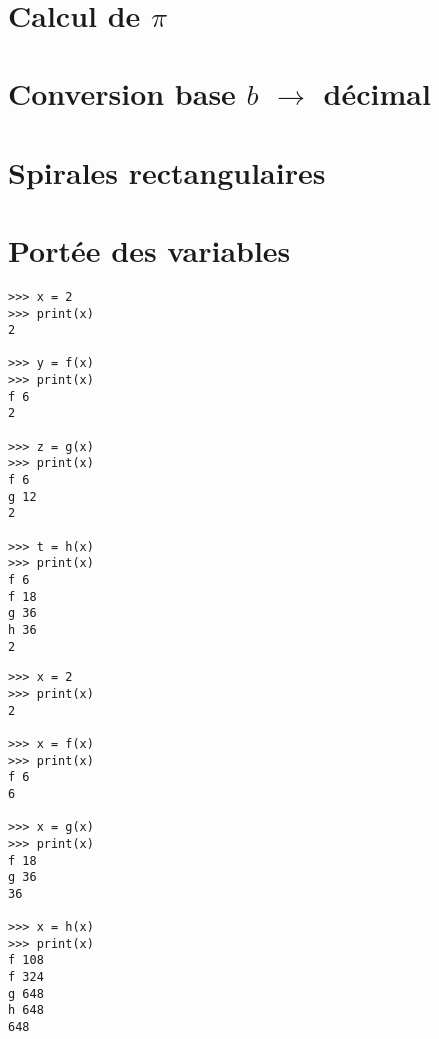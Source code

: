 \documentclass[11pt,a4paper]{article}
\begin{document}
\
\section{Calcul de $\pi$}


\section{Conversion base $b$ $\rightarrow$ décimal}


\section{Spirales rectangulaires}


\section{Portée des variables}
%

\begin{minipage}[t]{7cm}\footnotesize
\begin{verbatim}
>>> x = 2
>>> print(x)
2

>>> y = f(x)
>>> print(x)
f 6
2

>>> z = g(x)
>>> print(x)
f 6
g 12
2

>>> t = h(x)
>>> print(x)
f 6
f 18
g 36
h 36
2
\end{verbatim}
\end{minipage}
\hfill
\begin{minipage}[t]{7cm}\footnotesize
\begin{verbatim}
>>> x = 2
>>> print(x)
2

>>> x = f(x)
>>> print(x)
f 6
6

>>> x = g(x)
>>> print(x)
f 18
g 36
36

>>> x = h(x)
>>> print(x)
f 108
f 324
g 648
h 648
648
\end{verbatim}
\end{minipage}
\end{document}
